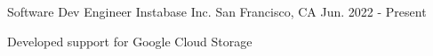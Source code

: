 

\begin{cventries}
  \cventry
    {Software Dev Engineer} %
    {Instabase Inc.} %
    {San Francisco, CA} %
    {Jun. 2022 - Present} %
    {
      \begin{cvitems} %
        \item {Developed support for Google Cloud Storage}
      \end{cvitems}
    }


\end{cventries}
